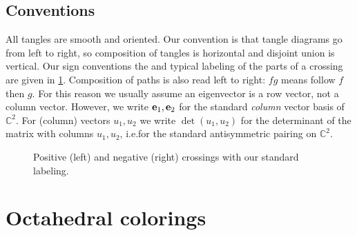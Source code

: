 \documentclass[leqno]{sl2art}
\begin{document}
%

\subsection*{Conventions}
All tangles are smooth and oriented.
Our convention is that tangle diagrams go from left to right, so composition of tangles is horizontal and disjoint union is vertical.
Our sign conventions the and typical labeling of the parts of a crossing are given in \cref{fig:crossing-types}.
Composition of paths is also read left to right: \(fg\) means follow \(f\) then \(g\).
For this reason we usually assume an eigenvector is a row vector, not a column vector.
However, we write \(\mathrm{\mathbf{e}}_{1}, \mathrm{\mathbf{e}}_{2}\) for the standard \emph{column} vector basis of \(\mathbb{C}^{2}\).
For (column) vectors \(u_1, u_2\) we write
\(
  \det\left( u_1, u_2 \right)
\)
for the determinant of the matrix with columns \(u_1, u_2\), i.e.\@ for the standard antisymmetric pairing on \(\mathbb{C}^2\).

\begin{figure}
  \centering
  
  \caption{Positive (left) and negative (right) crossings with our standard labeling.}
  \label{fig:crossing-types}
\end{figure}

\section{Octahedral colorings}
\label{sec:octahedral-colorings}
\end{document}
